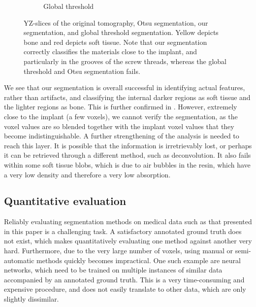 \begin{figure}
\begin{subfigure}{0.5\textwidth}
      \caption{Global threshold}
    \end{subfigure}
  \caption{
	  YZ-slices of the original tomography, Otsu segmentation, our
	  segmentation, and global threshold segmentation.  Yellow depicts bone
	  and red depicts soft tissue. Note that our segmentation correctly
	  classifies the materials close to the implant, and particularly in
	  the grooves of the screw threads, whereas the global threshold and
	  Otsu segmentation fails.
    }
    \label{fig:histology-comparison2}
\end{figure}

We see that our segmentation is overall successful in identifying actual
features, rather than artifacts, and classifying the internal darker regions as
soft tissue and the lighter regions as bone. This is further confirmed in
. However, extremely close to the implant (a few
voxels), we cannot verify the segmentation, as the voxel values are so blended
together with the implant voxel values that they become indistinguishable. A
further strengthening of the analysis is needed to reach this layer. It is
possible that the information is irretrievably lost, or perhaps it can be
retrieved through a different method, such as deconvolution.  It also fails
within some soft tissue blobs, which is due to air bubbles in the resin,
which have a very low density and therefore a very low absorption.

\subsection{Quantitative evaluation}

Reliably evaluating segmentation methods on medical data such as that
presented in this paper is a challenging task. A satisfactory annotated ground
truth does not exist, which makes quantitatively evaluating one method against
another very hard. Furthermore, due to the very large number of voxels, using
manual or semi-automatic methods quickly becomes impractical. One such example
are neural networks, which need to be trained on multiple instances of similar
data accompanied by an annotated ground truth. This is a very time-consuming
and expensive procedure, and does not easily translate to other data, which are
only slightly dissimilar.

